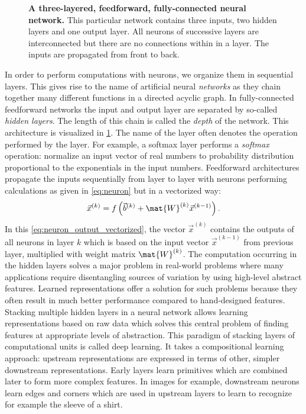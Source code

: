 \begin{figure}[htbp]
	\centering
	
	\caption[A three-layered, feedforward, fully-connected neural network.]{\textbf{A three-layered, feedforward, fully-connected neural network.} This particular network contains three inputs, two hidden layers and one output layer. All neurons of successive layers are interconnected but there are no connections within in a layer. The inputs are propagated from front to back.}
	\label{fig:three-layer-nn}
\end{figure}

In order to perform computations with neurons, we organize them in sequential layers. This gives rise to the name of artificial neural \textit{networks} as they chain together many different functions in a directed acyclic graph. In fully-connected feedforward networks the input and output layer are separated by so-called \textit{hidden layers}. The length of this chain is called the \emph{depth} of the network. This architecture is visualized in \cref{fig:three-layer-nn}. The name of the layer often denotes the operation performed by the layer. For example, a softmax layer performs a \emph{softmax} operation: normalize an input vector of real numbers to probability distribution proportional to the exponentials in the input numbers. Feedforward architectures propagate the inputs sequentially from layer to layer with neurons performing calculations as given in \cref{eq:neuron} but in a vectorized way:
\begin{equation} \label{eq:neuron_output_vectorized}
	\vec{x}^{(k)}=f\left(\vec{b}^{(k)} + \mat{W}^{(k)} \vec{x}^{(k-1)}\right).
\end{equation}
In this \cref{eq:neuron_output_vectorized}, the vector $\vec{x}^{(k)}$ contains the outputs of all neurons in layer $k$ which is based on the input vector $\vec{x}^{(k-1)}$ from previous layer, multiplied with weight matrix $\mat{W}^{(k)}$. The computation occurring in the hidden layers solves a major problem in real-world problems where many applications require disentangling sources of variation by using high-level abstract features. Learned representations offer a solution for such problems because they often result in much better performance compared to hand-designed features. Stacking multiple hidden layers in a neural network allows learning representations based on raw data which solves this central problem of finding features at appropriate levels of abstraction. This paradigm of stacking layers of computational units is called deep learning. It takes a compositional learning approach: upstream representations are expressed in terms of other, simpler downstream representations. Early layers learn primitives which are combined later to form more complex features. In images for example, downstream neurons learn edges and corners which are used in upstream layers to learn to recognize for example the sleeve of a shirt.

